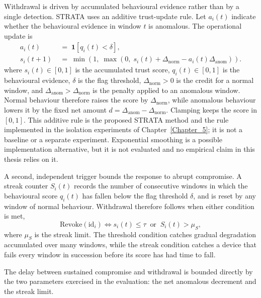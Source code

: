Withdrawal is driven by accumulated behavioural evidence rather than by a single
detection. STRATA uses an additive trust-update rule. Let $a_i(t)$ indicate
whether the behavioural evidence in window $t$ is anomalous. The operational
update is
\begin{equation}
\label{eq:trust-update}
\begin{aligned}
a_i(t) &\;=\; \mathbf{1}\!\left[q_i(t) < \delta\right], \\
s_i(t+1) &\;=\; \min\!\left(1,\;\max\!\left(0,\;
s_i(t)+\Delta_{\mathrm{norm}}-a_i(t)\Delta_{\mathrm{anom}}\right)\right) .
\end{aligned}
\end{equation}
where $s_i(t) \in [0,1]$ is the accumulated trust score, $q_i(t) \in [0,1]$
is the behavioural evidence, $\delta$ is the flag threshold,
$\Delta_{\mathrm{norm}}>0$ is the credit for a normal window, and
$\Delta_{\mathrm{anom}}>\Delta_{\mathrm{norm}}$ is the penalty applied to an
anomalous window. Normal behaviour therefore raises the score by
$\Delta_{\mathrm{norm}}$, while anomalous behaviour lowers it by the fixed net
amount $d=\Delta_{\mathrm{anom}}-\Delta_{\mathrm{norm}}$. Clamping keeps the
score in $[0,1]$. This additive rule is the proposed STRATA method and the rule
implemented in the isolation experiments of Chapter~\ref{Chapter_5}; it is not a
baseline or a separate experiment. Exponential smoothing is a possible
implementation alternative, but it is not evaluated and no empirical claim in
this thesis relies on it.

A second, independent trigger bounds the response to abrupt compromise. A streak counter $S_i(t)$ records the number of consecutive windows in which the behavioural score $q_i(t)$ has fallen below the flag threshold $\delta$, and is reset by any window of normal behaviour. Withdrawal therefore follows when either condition is met,
\begin{equation}
\label{eq:revoke-condition}
\mathrm{Revoke}(\mathrm{id}_i) \iff s_i(t) \leq \tau \;\; \text{or} \;\; S_i(t) > \mu_S ,
\end{equation}
where $\mu_S$ is the streak limit. The threshold condition catches gradual
degradation accumulated over many windows, while the streak condition catches a
device that fails every window in succession before its score has had time to
fall.

The delay between sustained compromise and withdrawal is bounded directly by
the two parameters exercised in the evaluation: the net anomalous decrement and
the streak limit.

